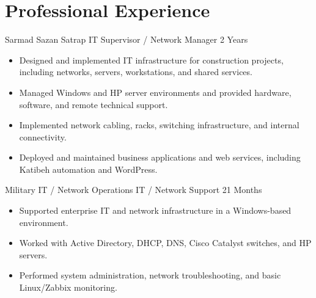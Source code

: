 \section{Professional Experience}

\experienceentry
    {Sarmad Sazan Satrap}
    {IT Supervisor / Network Manager}
    {2 Years}

\begin{itemize}
    \item Designed and implemented IT infrastructure for construction projects, including networks, servers, workstations, and shared services.
    \item Managed Windows and HP server environments and provided hardware, software, and remote technical support.
    \item Implemented network cabling, racks, switching infrastructure, and internal connectivity.
    \item Deployed and maintained business applications and web services, including Katibeh automation and WordPress.
\end{itemize}

\experienceentry
    {Military IT / Network Operations}
    {IT / Network Support}
    {21 Months}

\begin{itemize}
    \item Supported enterprise IT and network infrastructure in a Windows-based environment.
    \item Worked with Active Directory, DHCP, DNS, Cisco Catalyst switches, and HP servers.
    \item Performed system administration, network troubleshooting, and basic Linux/Zabbix monitoring.
\end{itemize}
